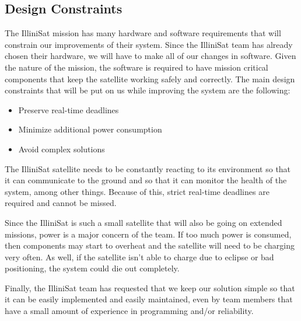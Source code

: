 \subsection{Design Constraints}
The IlliniSat mission has many hardware and software requirements that will constrain our improvements of their system. Since the IlliniSat team has already chosen their hardware, we will have to make all of our changes in software. Given the nature of the mission, the software is required to have mission critical components that keep the satellite working safely and correctly. The main design constraints that will be put on us while improving the system are the following:
\begin{itemize}
  \item Preserve real-time deadlines
  \item Minimize additional power consumption
  \item Avoid complex solutions
\end{itemize}
The IlliniSat satellite needs to be constantly reacting to its environment so that it can communicate to the ground and so that it can monitor the health of the system, among other things. Because of this, strict real-time deadlines are required and cannot be missed. 

Since the IlliniSat is such a small satellite that will also be going on extended missions, power is a major concern of the team. If too much power is consumed, then components may start to overheat and the satellite will need to be charging very often. As well, if the satellite isn't able to charge due to eclipse or bad positioning, the system could die out completely.

Finally, the IlliniSat team has requested that we keep our solution simple so that it can be easily implemented and easily maintained, even by team members that have a small amount of experience in programming and/or reliability. 
